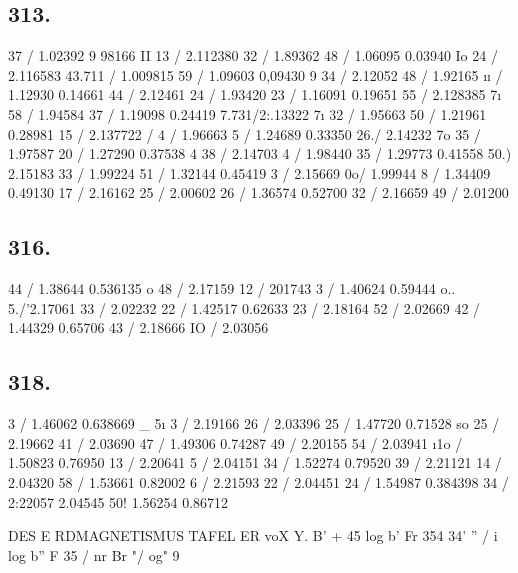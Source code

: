 \documentclass[12pt,a4paper]{article}
\begin{document}
\subsection*{313.}
37 / 1.02392 9 98166 II 13 / 2.112380 32 / 1.89362 48 / 1.06095 0.03940 Io 24 / 2.116583 43.711 / 1.009815 59 / 1.09603 0,09430 9 34 / 2.12052 48 / 1.92165 \i{}\i{} / 1.12930 0.14661 44 / 2.12461 24 / 1.93420 23 / 1.16091 0.19651 55 / 2.128385 7\i{} 58 / 1.94584 37 / 1.19098 0.24419 7.731/2:.13322 7\i{} 32 / 1.95663 50 / 1.21961 0.28981 15 / 2.137722 / 4 / 1.96663 5 / 1.24689 0.33350 26./ 2.14232 7o 35 / 1.97587 20 / 1.27290 0.37538 4 38 / 2.14703 4 / 1.98440 35 / 1.29773 0.41558 50.) 2.15183 33 / 1.99224 51 / 1.32144 0.45419 3 / 2.15669 0o/ 1.99944 8 / 1.34409 0.49130 17 / 2.16162 25 / 2.00602 26 / 1.36574 0.52700 32 / 2.16659 49 / 2.01200

\subsection*{316.}
44 / 1.38644 0.536135 o 48 / 2.17159 12 / 201743 3 / 1.40624 0.59444 o.. 5./'2.17061 33 / 2.02232 22 / 1.42517 0.62633 23 / 2.18164 52 / 2.02669 42 / 1.44329 0.65706 43 / 2.18666 IO / 2.03056

\subsection*{318.}
3 / 1.46062 0.638669 \_ 5\i{} 3 / 2.19166 26 / 2.03396 25 / 1.47720 0.71528 so 25 / 2.19662 41 / 2.03690 47 / 1.49306 0.74287 49 / 2.20155 54 / 2.03941 \i{}1o / 1.50823 0.76950 13 / 2.20641 5 / 2.04151 34 / 1.52274 0.79520 39 / 2.21121 14 / 2.04320 58 / 1.53661 0.82002 6 / 2.21593 22 / 2.04451 24 / 1.54987 0.384398 34 / 2:22057 2.04545 50! 1.56254 0.86712


\newpage


DES E RDMAGNETISMUS TAFEL ER voX Y. B' + 45\textdegree{} log b' Fr 354\textdegree{} 34' '' / i log b'' F 35 / nr Br "/ og" 9%
\end{document}
